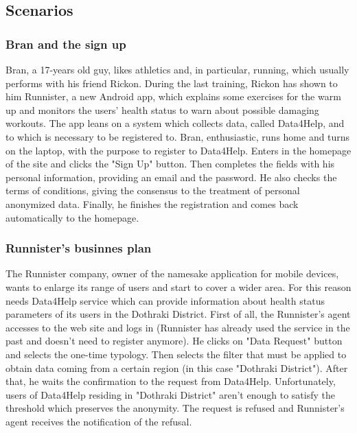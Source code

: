 \documentclass[a4paper]{article}
\begin{document}
\subsection{Scenarios}

\subsubsection{Bran and the sign up}
Bran, a 17-years old guy, likes athletics and, in particular, running, which usually performs with his friend Rickon. \newline
During the last training, Rickon has shown to him Runnister, a new Android app, which explains some exercises for the warm up and monitors the users' health status to warn about possible damaging workouts. The app leans on a system which collects data, called Data4Help, and to which is necessary to be registered to. \newline
Bran, enthusiastic, runs home and turns on the laptop, with the purpose to register to Data4Help. Enters in the homepage of the site and clicks the "Sign Up" button. Then completes the fields with his personal information, providing an email and the password. He also checks the terms of conditions, giving the consensus to the treatment of personal anonymized data. Finally, he finishes the registration and comes back automatically to the homepage.

\subsubsection{Runnister's businnes plan}
The Runnister company, owner of the namesake application for mobile devices, wants to enlarge its range of users and start to cover a wider area. For this reason needs Data4Help service which can provide information about health status parameters of its users in the Dothraki District. \newline
First of all, the Runnister's agent accesses to the web site and logs in (Runnister has already used the service in the past and doesn't need to register anymore). He clicks on "Data Request" button and selects the one-time typology. Then selects the filter that must be applied to obtain data coming from a certain region (in this case "Dothraki District"). After that, he waits the confirmation to the request from Data4Help. \newline
Unfortunately, users of Data4Help residing in "Dothraki District" aren't enough to satisfy the threshold which preserves the anonymity. The request is refused and Runnister's agent receives the notification of the refusal.
\end{document}
